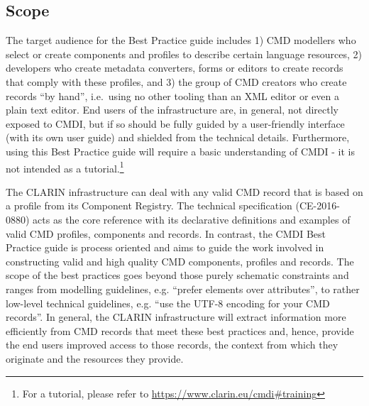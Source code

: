 \subsection{Scope}\label{scope}

The target audience for the Best Practice guide includes 1) CMD
modellers who select or create components and profiles to describe
certain language resources, 2) developers who create metadata
converters, forms or editors to create records that comply with these
profiles, and 3) the group of CMD creators who create records ``by
hand'', i.e.~using no other tooling than an XML editor or even a plain
text editor. End users of the infrastructure are, in general, not
directly exposed to CMDI, but if so should be fully guided by a
user-friendly interface (with its own user guide) and shielded from the
technical details. Furthermore, using this Best Practice guide will
require a basic understanding of CMDI - it is not intended as a
tutorial.\footnote{For a tutorial, please refer to
  \url{https://www.clarin.eu/cmdi\#training}}

The CLARIN infrastructure can deal with any valid CMD record that is
based on a profile from its Component Registry. The technical
specification (CE-2016-0880) acts as the core reference with its
declarative definitions and examples of valid CMD profiles, components
and records. In contrast, the CMDI Best Practice guide is process
oriented and aims to guide the work involved in constructing valid and
high quality CMD components, profiles and records. The scope of the best
practices goes beyond those purely schematic constraints and ranges from
modelling guidelines, e.g. ``prefer elements over attributes'', to
rather low-level technical guidelines, e.g. ``use the UTF-8 encoding for
your CMD records''. In general, the CLARIN infrastructure will extract
information more efficiently from CMD records that meet these best
practices and, hence, provide the end users improved access to those
records, the context from which they originate and the resources they
provide.
